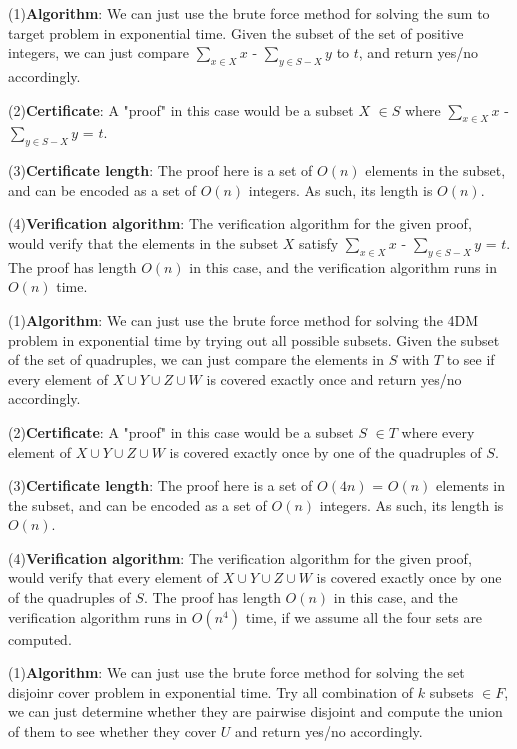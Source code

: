 \documentclass[12pt,a4paper]{article}
\newcommand{\question}[1]{\bigskip\noindent{\textbf{Q{#1} solution}}}
\begin{document}
\question{31.C}

(1)\textbf{Algorithm}: We can just use the brute force method for solving the sum to target problem in exponential time.
Given the subset of the set of positive integers, we can just compare ${\sum_{x\in X}x}$ - ${\sum_{y\in S-X} y}$ to $t$, and return yes/no accordingly.

(2)\textbf{Certificate}: A "proof" in this case would be a subset $X$ $\in S$ where ${\sum_{x\in X}x}$ - ${\sum_{y\in S-X} y}$ = $t$.

(3)\textbf{Certificate length}: The proof here is a set of $O(n)$ elements in the subset, and can be encoded as a set of $O(n)$ integers. As such, its length is $O(n)$.

(4)\textbf{Verification algorithm}: The verification algorithm for the given proof, would verify that the elements in the subset $X$ satisfy ${\sum_{x\in X}x}$ - ${\sum_{y\in S-X} y}$ = $t$.
The proof has length $O(n)$ in this case, and the verification algorithm runs in $O(n)$ time.

\question{31.D}

(1)\textbf{Algorithm}: We can just use the brute force method for solving the 4DM problem in exponential time by trying out all possible subsets.
Given the subset of the set of quadruples, we can just compare the elements in $S$ with $T$ to see if every element of $X\cup Y\cup Z\cup W$ is covered exactly once and return yes/no accordingly.

(2)\textbf{Certificate}: A "proof" in this case would be a subset $S$ $\in T$ where every element of $X\cup Y\cup Z\cup W$ is covered exactly once by one of the quadruples of $S$.

(3)\textbf{Certificate length}: The proof here is a set of $O(4n)$ = $O(n)$ elements in the subset, and can be encoded as a set of $O(n)$ integers. As such, its length is $O(n)$.

(4)\textbf{Verification algorithm}: The verification algorithm for the given proof, would verify that every element of $X\cup Y\cup Z\cup W$ is covered exactly once by one of the quadruples of $S$.
The proof has length $O(n)$ in this case, and the verification algorithm runs in $O(n^4)$ time, if we assume all the four sets are computed.

\question{31.E}

(1)\textbf{Algorithm}: We can just use the brute force method for solving the set disjoinr cover problem in exponential time.
Try all combination of $k$ subsets $\in F$, we can just determine whether they are pairwise disjoint and compute the union of them to see whether they cover $U$ and return yes/no accordingly.
\end{document}
